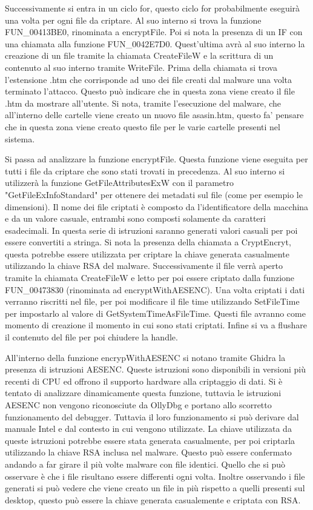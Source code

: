 \documentclass[a4paper,12pt]{article}
\begin{document}
Successivamente si entra in un ciclo for, questo ciclo for probabilmente eseguirà una volta per ogni file da criptare. Al suo interno si trova la funzione FUN\_00413BE0, rinominata a encryptFile. Poi si nota la presenza di un IF con una chiamata alla funzione FUN\_0042E7D0. Quest'ultima avrà al suo interno la creazione di un file tramite la chiamata CreateFileW e la scrittura di un contenuto al suo interno tramite WriteFile. Prima della chiamata si trova l'estensione .htm che corrisponde ad uno dei file creati dal malware una volta terminato l'attacco. Questo può indicare che in questa zona viene creato il file .htm da mostrare all'utente. Si nota, tramite l'esecuzione del malware, che all'interno delle cartelle viene creato un nuovo file asasin.htm, questo fa' pensare che in questa zona viene creato questo file per le varie cartelle presenti nel sistema.

Si passa ad analizzare la funzione encryptFile. Questa funzione viene eseguita per tutti i file da criptare che sono stati trovati in precedenza. Al suo interno si utilizzerà la funzione GetFileAttributesExW con il parametro "GetFileExInfoStandard" per ottenere dei metadati sul file (come per esempio le dimensioni).  Il nome dei file criptati è composto da l'identificatore della macchina e da un valore casuale, entrambi sono composti solamente da caratteri esadecimali. In questa serie di istruzioni saranno generati valori casuali per poi essere convertiti a stringa.
Si nota la presenza della chiamata a CryptEncryt, questa potrebbe essere utilizzata per criptare la chiave generata casualmente utilizzando la chiave RSA del malware.
Successivamente il file verrà aperto tramite la chiamata CreateFileW e letto per poi essere criptato dalla funzione FUN\_00473830 (rinominata ad encryptWithAESENC). Una volta criptati i dati verranno riscritti nel file, per poi modificare il file time utilizzando SetFileTime per impostarlo al valore di GetSystemTimeAsFileTime. Questi file avranno come momento di creazione il momento in cui sono stati criptati. Infine si va a flushare il contenuto del file per poi chiudere la handle. 

All'interno della funzione encrypWithAESENC si notano tramite Ghidra la presenza di istruzioni AESENC. Queste istruzioni sono disponibili in versioni più recenti di CPU ed offrono il supporto hardware alla criptaggio di dati. Si è tentato di analizzare dinamicamente questa funzione, tuttavia le istruzioni AESENC non vengono riconosciute da OllyDbg e portano allo scorretto funzionamento del debugger. Tuttavia il loro funzionamento si può derivare dal manuale Intel e dal contesto in cui vengono utilizzate. La chiave utilizzata da queste istruzioni potrebbe essere stata generata casualmente, per poi criptarla utilizzando la chiave RSA inclusa nel malware. Questo può essere confermato andando a far girare il  più volte malware con file identici. Quello che si può osservare è che i file risultano essere differenti ogni volta. Inoltre osservando i file generati si può vedere che viene creato un file in più rispetto a quelli presenti sul desktop, questo può essere la chiave generata casualemente e criptata con RSA.
 
\end{document}
